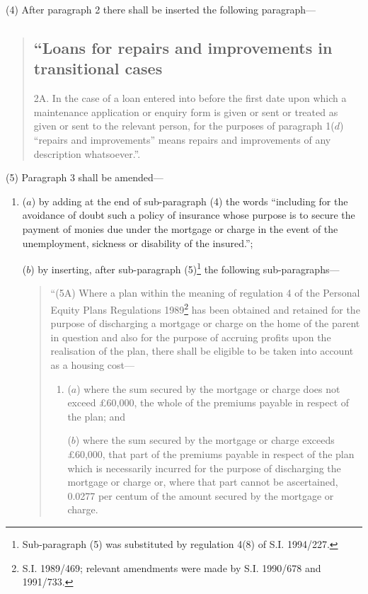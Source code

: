\documentclass[12pt,a4paper]{article}
\begin{document}
(4) After paragraph 2 there shall be inserted the following paragraph—
\begin{quotation}
\subsection*{\sloppy “Loans for repairs and improvements in transitional cases}

2A.  In the case of a loan entered into before the first date upon which a maintenance application or enquiry form is given or sent or treated as given or sent to the relevant person, for the purposes of paragraph 1($d$) “repairs and improvements” means repairs and improvements of any description whatsoever.”.
\end{quotation}

(5) Paragraph 3 shall be amended—
\begin{enumerate}\item[]
($a$) by adding at the end of sub-paragraph (4) the words “including for the avoidance of doubt such a policy of insurance whose purpose is to secure the payment of monies due under the mortgage or charge in the event of the unemployment, sickness or disability of the insured.”;

($b$) by inserting, after sub-paragraph (5)\footnote{\frenchspacing Sub-paragraph (5) was substituted by regulation 4(8) of S.I. 1994/227.} the following sub-\hspace{0pt}paragraphs—
\begin{quotation}
“(5A) Where a plan within the meaning of regulation 4 of the Personal Equity Plans Regulations 1989\footnote{\frenchspacing S.I. 1989/469; relevant amendments were made by S.I. 1990/678 and 1991/733.} has been obtained and retained for the purpose of discharging a mortgage or charge on the home of the parent in question and also for the purpose of accruing profits upon the realisation of the plan, there shall be eligible to be taken into account as a housing cost—
\begin{enumerate}\item[]
($a$) where the sum secured by the mortgage or charge does not exceed £60,000, the whole of the premiums payable in respect of the plan; and

($b$) where the sum secured by the mortgage or charge exceeds £60,000, that part of the premiums payable in respect of the plan which is necessarily incurred for the purpose of discharging the mortgage or charge or, where that part cannot be ascertained, 0.0277 per centum of the amount secured by the mortgage or charge.
\end{enumerate}


\end{quotation}
\end{enumerate}
\end{document}
